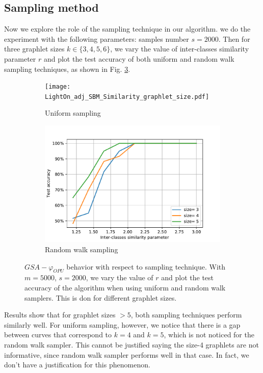 \subsection{Sampling method}
Now we explore the role of the sampling technique in our algorithm. we do the experiment with the following parameters: samples number $s=2000$.
Then for three graphlet sizes $k\in\{3,4,5,6\}$, we vary the value of inter-classes similarity parameter $r$ and plot the test accuracy of both uniform and random walk sampling techniques, as shown in Fig. \ref{fig:comp_sampling}.
\begin{figure}
     \centering
     \begin{subfigure}[b]{0.4\textwidth}
         \centering
         \texttt{[image: LightOn\_adj\_SBM\_Similarity\_graphlet\_size.pdf]}
         \caption{Uniform sampling}
         \label{fig:y equals x}
     \end{subfigure}
     \hfill
     \begin{subfigure}[b]{0.4\textwidth}
         \centering
         \includegraphics[width=\textwidth]{figs/LightOn_adj_SBM_similarity_graphlet_size_RW.pdf}
         \caption{Random walk sampling}
         \label{fig:three sin x}
     \end{subfigure}
        \caption [$GSA-\varphi_{OPU}$ behavior with respect to sampling technique]{$GSA-\varphi_{OPU}$ behavior with respect to sampling technique. With $m=5000$, $s=2000$, we vary the value of $r$ and plot the test accuracy of the algorithm when using uniform and random walk samplers. This is don for different graphlet sizes.}
\label{fig:comp_sampling}
\end{figure}
Results show that for graphlet sizes $>5$, both sampling techniques perform similarly well. For uniform sampling, however, we notice that there is a gap between curves that correspond to $k=4$ and $k=5$, which is not noticed for the random walk sampler. This cannot be justified saying the size-4 graphlets are not informative, since random walk sampler performs well in that case. In fact, we don't have a justification for this phenomenon.  

